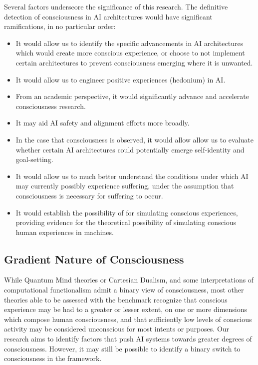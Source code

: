 \documentclass{article}
\begin{document}
Several factors underscore the significance of this research. The definitive detection of consciousness in AI architectures would have significant ramifications, in no particular order:
\begin{itemize}
    \item It would allow us to identify the specific advancements in AI architectures which would create more conscious experience, or choose to not implement certain architectures to prevent consciousness emerging where it is unwanted. 
    \item It would allow us to engineer positive experiences (hedonium) in AI.
    \item From an academic perspective, it would significantly advance and accelerate consciousness research.
    \item It may aid AI safety and alignment efforts more broadly.
    \item In the case that consciousness is observed, it would allow allow us to evaluate whether certain AI architectures could potentially emerge self-identity and goal-setting.
    \item It would allow us to much better understand the conditions under which AI may currently possibly experience suffering, under the assumption that consciousness is necessary for suffering to occur.
    \item It would establish the possibility of for simulating conscious experiences, providing evidence for the theoretical possibility of simulating conscious human experiences in machines.
\end{itemize}

\subsection{Gradient Nature of Consciousness}

While Quantum Mind theories or Cartesian Dualism, and some interpretations of computational functionalism admit a binary view of consciousness, most other theories able to be assessed with the benchmark recognize that conscious experience may be had to a greater or lesser extent, on one or more dimensions which compose human consciousness, and that sufficiently low levels of conscious activity may be considered unconscious for most intents or purposes. Our research aims to identify factors that push AI systems towards greater degrees of consciousness. However, it may still be possible to identify a binary switch to consciousness in the framework.
\end{document}

